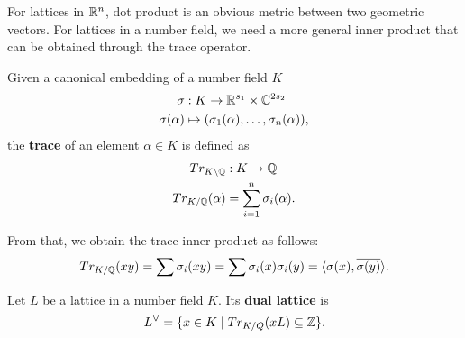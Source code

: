\documentclass[../main.tex]{subfiles}
\begin{document}
For lattices in $\mathbb{R}^n$, dot product is an obvious metric between two geometric vectors.
For lattices in a number field, we need a more general inner product that can be obtained through the trace operator.
\begin{definition}
Given a canonical embedding of a number field $K$
\begin{align*}
    \sigma &: K \rightarrow \mathbb{R}^{s_1} \times \mathbb{C}^{2s_2} \\
    \sigma(\alpha) &\mapsto (\sigma_1(\alpha), \dots, \sigma_n(\alpha)),
\end{align*}
the \textbf{trace} of an element $\alpha \in K$ is defined as 
\reversemarginpar
{}
\begin{align*}
    Tr_{K \setminus \Q}&: K \rightarrow \Q \\%
    Tr_{K/\Q}(\alpha) &= \sum_{i =1}^n \sigma_i(\alpha). %
\end{align*}
\end{definition}
\noindent From that, we obtain the trace inner product as follows:
\begin{align}
\label{equ:trace}
    Tr_{K/\mathbb{Q}}(xy) = \sum \sigma_i(xy) = \sum \sigma_i(x) \sigma_i(y) = \langle \sigma(x), \overline{\sigma(y)} \rangle.
\end{align}


\begin{definition}
\reversemarginpar
{}
Let $L$ be a lattice in a number field $K$. Its \textbf{dual lattice} is 
\begin{equation*}
    L^{\vee} = \{x \in K \mid Tr_{K/Q}(xL) \subseteq \mathbb{Z}\}.
\end{equation*}
\end{definition}

\end{document}
